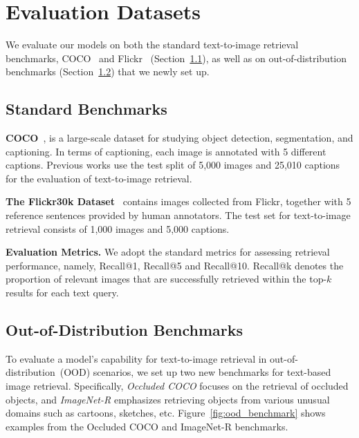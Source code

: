 \section{Evaluation Datasets}

We evaluate our models on both the standard text-to-image retrieval benchmarks, COCO~\cite{lin2014microsoft} and Flickr~\cite{plummer2015flickr30k} (Section~\ref{sec:standard_benchmark}), as well as on out-of-distribution benchmarks (Section~\ref{sec:ood_benchmark}) that we newly set up.

\subsection{Standard Benchmarks}
\label{sec:standard_benchmark}


\noindent \textbf{COCO}~\cite{lin2014microsoft},
is a large-scale dataset for studying object detection, segmentation, and captioning. In terms of captioning, each image is annotated with 5 different captions. Previous works use the test split of 5,000 images and 25,010 captions for the evaluation of text-to-image retrieval. 

\vspace{2pt} \noindent \textbf{The Flickr30k Dataset}~\cite{plummer2015flickr30k} contains images collected from Flickr, together with 5 reference sentences provided by human annotators. The test set for text-to-image retrieval consists of 1,000 images and 5,000 captions.

\vspace{2pt} \noindent \textbf{Evaluation Metrics.} 
We adopt the standard metrics for assessing retrieval performance,
namely, Recall@1, Recall@5 and Recall@10. Recall@k denotes the proportion of relevant images that are successfully retrieved within the top-$k$ results for each text query. 



\subsection{Out-of-Distribution Benchmarks}
\label{sec:ood_benchmark}

To evaluate a model's capability for text-to-image retrieval in out-of-distribution~(OOD) scenarios, we set up two new benchmarks for text-based image retrieval.
Specifically, \emph{Occluded COCO} focuses on the retrieval of occluded objects, and \emph{ImageNet-R} emphasizes retrieving objects from various unusual domains such as cartoons, sketches, etc. 
Figure~\ref{fig:ood_benchmark} shows examples from the Occluded COCO and ImageNet-R benchmarks.

